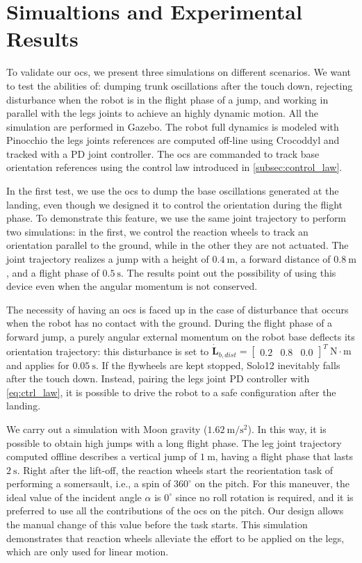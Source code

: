 \documentclass[letterpaper, 10 pt, conference]{ieeeconf}  %
\begin{document}
\section{Simualtions and Experimental Results}
To validate our \gls{ocs}, we present three simulations on different scenarios. We want to test the abilities of: dumping trunk oscillations after the touch down, rejecting disturbance when the robot is in the flight phase of a jump, and working in parallel with the legs joints to achieve an highly dynamic motion. All the simulation are performed in Gazebo. The robot full dynamics is modeled with Pinocchio \cite{carpentier2019pinocchio} the legs joints references are computed off-line using Crocoddyl \cite{mastalli2020crocoddyl} and tracked with a PD joint controller. The \gls{ocs} are commanded to track base orientation references using the control law introduced in \ref{subsec:control_law}.

In the first test, we use the \gls{ocs} to dump the base oscillations generated at the landing, even though we designed it to control the orientation during the flight phase.
To demonstrate this feature, we use the same joint trajectory to perform two simulations: in the first, we control the reaction wheels to track an orientation parallel to the ground, while in the other they are not actuated.
The joint trajectory realizes a jump with a height of $0.4 \ \mathrm{m}$, a forward distance of $0.8 \ \mathrm{m}$, and a flight phase of $0.5 \ \mathrm{s}$.
The results point out the possibility of using this device even when the angular momentum is not conserved.

The necessity of having an \gls{ocs} is faced up in the case of disturbance that occurs when the robot has no contact with the ground. During the flight phase of a forward jump, a purely angular external momentum on the robot base deflects its orientation trajectory: this disturbance is set to $\dot{\bm{L}}_{b, dist} = \left[\begin{array}{ccc}
0.2 & 0.8 & 0.0
\end{array}
\right]^T \ \mathrm{N \cdot m}$ and applies for $0.05 \ \mathrm{s}$. If the flywheels are kept stopped, Solo12 inevitably falls after the touch down. Instead, pairing the legs joint PD controller with \ref{eq:ctrl_law}, it is possible to drive the robot to a safe configuration after the landing.

We carry out a simulation with Moon gravity ($1.62 \ \mathrm{m/s^2}$).
In this way, it is possible to obtain high jumps with a long flight phase.
The leg joint trajectory computed offline describes a vertical jump of $1 \ \mathrm{m}$, having a flight phase that lasts $2 \ \mathrm{s}$.
Right after the lift-off, the reaction wheels start the reorientation task of performing a somersault, i.e., a spin of $360^\circ$ on the pitch.
For this maneuver, the ideal value of the incident angle $\alpha$ is $0^\circ$ since no roll rotation is required, and it is preferred to use all the contributions of the \gls{ocs} on the pitch.
Our design allows the manual change of this value before the task starts.
This simulation demonstrates that reaction wheels alleviate the effort to be applied on the legs, which are only used for linear motion.
\end{document}
